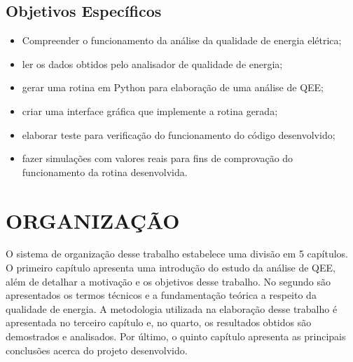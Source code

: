 \subsection{Objetivos Específicos}

\begin{itemize}
  \item Compreender o funcionamento da análise da qualidade de energia elétrica;
  \item ler os dados obtidos pelo analisador de qualidade de energia;
  \item gerar uma rotina em Python para elaboração de uma análise de QEE;
  \item criar uma interface gráfica que implemente a rotina gerada;
  \item elaborar teste para verificação do funcionamento do código desenvolvido;
  \item fazer simulações com valores reais para fins de comprovação do funcionamento da rotina desenvolvida.
\end{itemize}

\section{ORGANIZAÇÃO}

O sistema de organização desse trabalho estabelece uma divisão em 5 capítulos. O primeiro capítulo apresenta uma introdução do estudo da análise de QEE, além de detalhar a motivação e os objetivos desse trabalho. No segundo são apresentados os termos técnicos e a fundamentação teórica a respeito da qualidade de energia. A metodologia utilizada na elaboração desse trabalho é apresentada no terceiro capítulo e, no quarto, os resultados obtidos são demostrados e analisados. Por último, o quinto capítulo apresenta as principais conclusões acerca do projeto desenvolvido.
